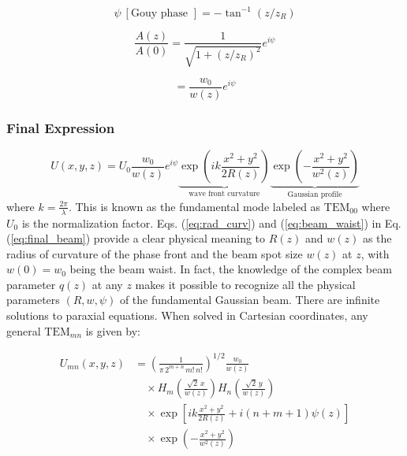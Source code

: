 \begin{equation}
\psi \ [\text{Gouy phase }]= -\tan^{-1}(z/z_R)
\end{equation}

\begin{equation}
\frac{A(z)}{A(0)} =
\frac{1}{\sqrt{1+(z/z_R)^2}} e^{i\psi}
\end{equation}

\begin{equation}
= \frac{w_0}{w(z)} e^{i\psi}
\end{equation}

\subsubsection*{Final Expression}

\begin{equation}
U(x,y,z) = U_0 \frac{w_0}{w(z)} e^{i\psi}
\underbrace{\exp\left(i k \frac{x^2+y^2}{2R(z)}\right)}_{\text{wave front curvature}}
\underbrace{\exp\left(-\frac{x^2+y^2}{w^2(z)}\right)}_{\text{Gaussian profile}} \label{eq:final_beam}
\end{equation}
where $ k = \frac{2\pi}{\lambda} $. This is known as the fundamental mode labeled as $\text{TEM}_{00}$
where $U_0$ is the normalization factor. Eqs. (\ref{eq:rad_curv}) and (\ref{eq:beam_waist}) in Eq. (\ref{eq:final_beam}) provide a clear
physical meaning to $R(z)$ and $w(z)$ as the radius of curvature of the phase front and the beam spot size $w(z)$ at $z$, with $w(0) = w_0$ being the beam waist. In fact, the knowledge of the complex beam parameter $q(z)$ at any $z$ makes it possible to recognize all the physical parameters $(R, w, \psi)$ of the fundamental Gaussian beam. There are infinite solutions to paraxial equations. When solved in Cartesian coordinates, any general $\mathrm{TEM}_{mn}$ is given
by:

\begin{equation}
\begin{split}
U_{mn}(x,y,z) &=
\left( \frac{1}{\pi \, 2^{m+n} \, m! \, n!} \right)^{1/2}
\frac{w_0}{w(z)} \\
&\quad \times
H_m \left( \frac{\sqrt{2}\,x}{w(z)} \right)
H_n \left( \frac{\sqrt{2}\,y}{w(z)} \right) \\
&\quad \times
\exp\left[
i k \frac{x^2 + y^2}{2R(z)}
+ i(n+m+1)\psi(z)
\right] \\
&\quad \times
\exp\left(
-\frac{x^2 + y^2}{w^2(z)}
\right)
\end{split}
\label{eq:HG_beam}
\end{equation}

